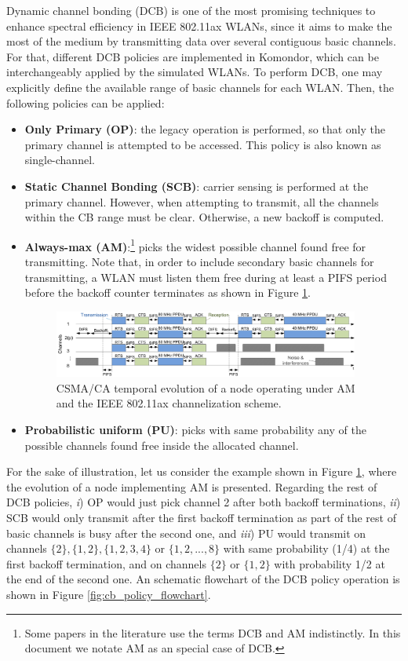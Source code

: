 \documentclass[a4paper]{article}
\begin{document}
	Dynamic channel bonding (DCB) is one of the most promising techniques to enhance spectral efficiency in IEEE 802.11ax WLANs, since it aims to make the most of the medium by transmitting data over several contiguous basic channels. For that, different DCB policies are implemented in Komondor, which can be interchangeably applied by the simulated WLANs. To perform DCB, one may explicitly define the available range of basic channels for each WLAN. Then, the following policies can be applied:
	\begin{itemize}
		\item \textbf{Only Primary (OP)}: the legacy operation is performed, so that only the primary channel is attempted to be accessed. This policy is also known as single-channel.
		\item \textbf{Static Channel Bonding (SCB)}: carrier sensing is performed at the primary channel. However, when attempting to transmit, all the channels within the CB range must be clear. Otherwise, a new backoff is computed.
		\item \textbf{Always-max (AM)}:\footnote{Some papers in the literature use the terms DCB and AM indistinctly. In this document we notate AM as an special case of DCB.} picks the widest possible channel found free for transmitting. Note that, in order to include secondary basic channels for transmitting, a WLAN must listen them free during at least a PIFS period before the backoff counter terminates as shown in Figure \ref{fig:dcb_dcf}.
		\begin{figure}
			\centering
			\includegraphics[width=0.95\textwidth]{images/dcb_dcf.png}
			\caption{CSMA/CA temporal evolution of a node operating under AM and the IEEE 802.11ax channelization scheme.}
			\label{fig:dcb_dcf}
		\end{figure}
		\item \textbf{Probabilistic uniform (PU)}: picks with same probability any of the possible channels found free inside the allocated channel.

	\end{itemize}

	For the sake of illustration, let us consider the example shown in Figure \ref{fig:dcb_dcf}, where the evolution of a node implementing AM is presented. Regarding the rest of DCB policies, \textit{i}) OP would just pick channel 2 after both backoff terminations, \textit{ii}) SCB would only transmit after the first backoff termination as part of the rest of basic channels is busy after the second one, and \textit{iii}) PU would transmit on channels $\{2\}, \{1,2\}, \{1,2,3,4\}$ or $\{1,2,...,8\}$ with same probability (1/4) at the first backoff termination, and on channels $\{2\}$ or $\{1,2\}$ with probability 1/2 at the end of the second one. An schematic flowchart of the DCB policy operation is shown in Figure \ref{fig:cb_policy_flowchart}.
	
\end{document}
